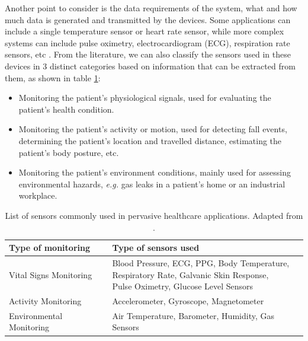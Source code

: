 Another point to consider is the data requirements of the system, what and how much data is generated and transmitted by the devices. Some applications can include a single temperature sensor or heart rate sensor, while more complex systems can include pulse oximetry, electrocardiogram (\acs{ECG}), respiration rate sensors, etc \cite{Wu2020}. From the literature, we can also classify the sensors used in these devices in 3 distinct categories based on information that can be extracted from them, as shown in table \ref{tab:layer1-sensors}:

\begin{itemize}
    \item Monitoring the patient's physiological signals, used for evaluating the patient's health condition.
    \item Monitoring the patient's activity or motion, used for detecting fall events, determining the patient's location and travelled distance, estimating the patient's body posture, etc.
    \item Monitoring the patient's environment conditions, mainly used for assessing environmental hazards, \textit{e.g.} gas leaks in a patient's home or an industrial workplace.
\end{itemize}


\renewcommand{\arraystretch}{2}
\begin{table}[H]
    \centering
    \begin{tabular}{l|l}
        \textbf{Type of monitoring} & \textbf{Type of sensors used} \\ 
        \hline
        Vital Signs Monitoring & \makecell{Blood Pressure, \acs{ECG}, \acs{PPG}, Body Temperature, \\ Respiratory Rate, Galvanic Skin Response, \\ Pulse Oximetry, Glucose Level Sensors} \\
        Activity Monitoring & Accelerometer, Gyroscope, Magnetometer\\
        Environmental Monitoring & Air Temperature, Barometer, Humidity, Gas Sensors \\
    \end{tabular}
    \caption[List of sensors commonly used in pervasive healthcare applications.]{List of sensors commonly used in pervasive healthcare applications. Adapted from \cite{MinhDang2019}.}
    \label{tab:layer1-sensors} 
\end{table}
\renewcommand{\arraystretch}{1}

